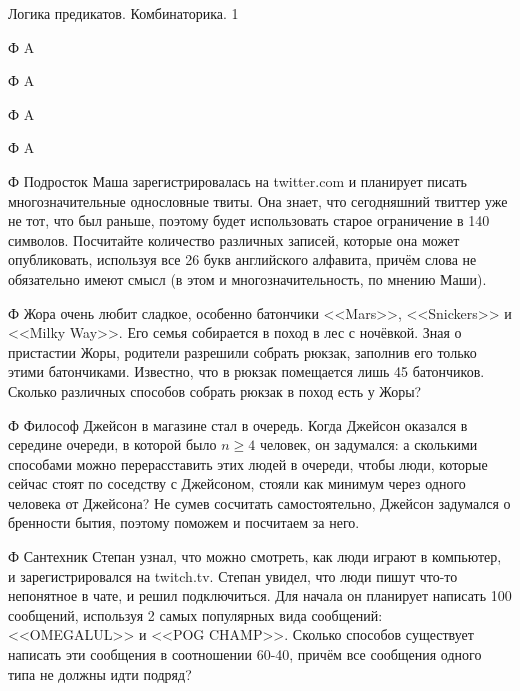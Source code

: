 



{Логика предикатов. Комбинаторика.}
{1}

\begin{problemList}

\problemItemSimple
{Ф}
{A}

\problemItemSimple
{Ф}
{A}

\problemItemSimple
{Ф}
{A}

\problemItemSimple
{Ф}
{A}

\problemItemSimple
{Ф}
{Подросток Маша зарегистрировалась на twitter.com и планирует писать многозначительные однословные твиты. Она знает, что сегодняшний твиттер уже не тот, что был раньше, поэтому будет использовать старое ограничение в 140 символов. Посчитайте количество различных записей, которые она может опубликовать, используя все 26 букв английского алфавита, причём слова не обязательно имеют смысл (в этом и многозначительность, по мнению Маши).}

\problemItemSimple
{Ф}
{Жора очень любит сладкое, особенно батончики <<Mars>>, <<Snickers>> и <<Milky Way>>. Его семья собирается в поход в лес с ночёвкой. Зная о пристастии Жоры, родители разрешили собрать рюкзак, заполнив его только этими батончиками. Известно, что в рюкзак помещается лишь 45 батончиков. Сколько различных способов собрать рюкзак в поход есть у Жоры?}

\problemItemSimple
{Ф}
{Философ Джейсон в магазине стал в очередь. Когда Джейсон оказался в середине очереди, в которой было $n \geq 4$ человек, он задумался: а сколькими способами можно перерасставить этих людей в очереди, чтобы люди, которые сейчас стоят по соседству с Джейсоном, стояли как минимум через одного человека от Джейсона? Не сумев сосчитать самостоятельно, Джейсон задумался о бренности бытия, поэтому поможем и посчитаем за него.}

\problemItemSimple
{Ф}
{Сантехник Степан узнал, что можно смотреть, как люди играют в компьютер, и зарегистрировался на twitch.tv. Степан увидел, что люди пишут что-то непонятное в чате, и решил подключиться. Для начала он планирует написать 100 сообщений, используя 2 самых популярных вида сообщений: <<OMEGALUL>> и <<POG CHAMP>>. Сколько способов существует написать эти сообщения в соотношении 60-40, причём все сообщения одного типа не должны идти подряд?}

\end{problemList}

